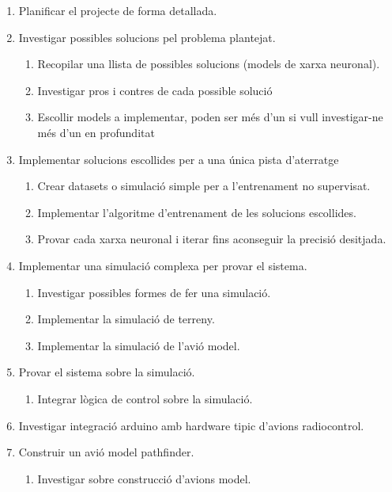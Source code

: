 \documentclass[10pt,a4paper,twocolumn,twoside]{article}
\begin{document}
\begin{enumerate}
    \item Planificar el projecte de forma detallada.
    \item Investigar possibles solucions pel problema plantejat.
    \begin{enumerate}[label*=\arabic*.]
        \item Recopilar una llista de possibles solucions (models de xarxa neuronal).
        \item Investigar pros i contres de cada possible solució
        \item Escollir models a implementar, poden ser més d'un si vull investigar-ne més d'un en profunditat
    \end{enumerate}
    \item Implementar solucions escollides per a una única pista d'aterratge
    \begin{enumerate}[label*=\arabic*.]
        \item Crear datasets o simulació simple per a l'entrenament no supervisat.
        \item Implementar l'algoritme d'entrenament de les solucions escollides.
        \item Provar cada xarxa neuronal i iterar fins aconseguir la precisió desitjada.
    \end{enumerate}
    \item Implementar una simulació complexa per provar el sistema.
    \begin{enumerate}[label*=\arabic*.]
        \item Investigar possibles formes de fer una simulació.
        \item Implementar la simulació de terreny.
        \item Implementar la simulació de l'avió model.
    \end{enumerate}
    \item Provar el sistema sobre la simulació.
    \begin{enumerate}[label*=\arabic*.]
        \item Integrar lògica de control sobre la simulació.
    \end{enumerate}
    \item Investigar integració arduino amb hardware tipic d'avions radiocontrol.
    \item Construir un avió model pathfinder.
    \begin{enumerate}[label*=\arabic*.]
        \item Investigar sobre construcció d'avions model.

\end{enumerate}
\end{enumerate}
\end{document}
